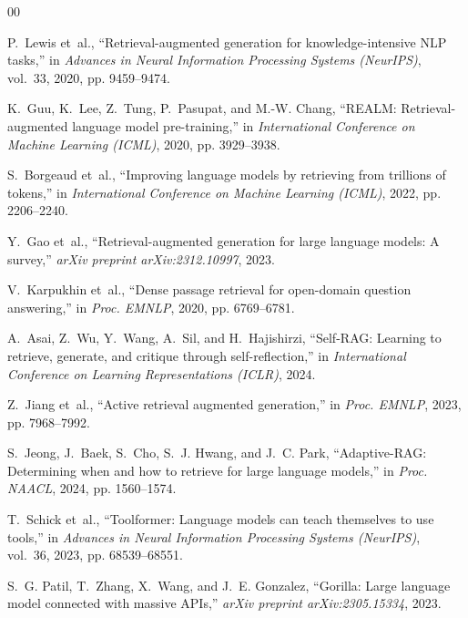 \documentclass[conference,onecolumn,10pt]{IEEEtran}
\begin{document}
\begin{thebibliography}{00}

P.~Lewis et~al., ``Retrieval-augmented generation for knowledge-intensive {NLP} tasks,'' in \textit{Advances in Neural Information Processing Systems (NeurIPS)}, vol.~33, 2020, pp. 9459--9474.

K.~Guu, K.~Lee, Z.~Tung, P.~Pasupat, and M.-W. Chang, ``{REALM}: Retrieval-augmented language model pre-training,'' in \textit{International Conference on Machine Learning (ICML)}, 2020, pp. 3929--3938.

S.~Borgeaud et~al., ``Improving language models by retrieving from trillions of tokens,'' in \textit{International Conference on Machine Learning (ICML)}, 2022, pp. 2206--2240.

Y.~Gao et~al., ``Retrieval-augmented generation for large language models: A survey,'' \textit{arXiv preprint arXiv:2312.10997}, 2023.

V.~Karpukhin et~al., ``Dense passage retrieval for open-domain question answering,'' in \textit{Proc. EMNLP}, 2020, pp. 6769--6781.

A.~Asai, Z.~Wu, Y.~Wang, A.~Sil, and H.~Hajishirzi, ``Self-{RAG}: Learning to retrieve, generate, and critique through self-reflection,'' in \textit{International Conference on Learning Representations (ICLR)}, 2024.

Z.~Jiang et~al., ``Active retrieval augmented generation,'' in \textit{Proc. EMNLP}, 2023, pp. 7968--7992.

S.~Jeong, J.~Baek, S.~Cho, S.~J. Hwang, and J.~C. Park, ``Adaptive-{RAG}: Determining when and how to retrieve for large language models,'' in \textit{Proc. NAACL}, 2024, pp. 1560--1574.

T.~Schick et~al., ``Toolformer: Language models can teach themselves to use tools,'' in \textit{Advances in Neural Information Processing Systems (NeurIPS)}, vol.~36, 2023, pp. 68539--68551.

S.~G. Patil, T.~Zhang, X.~Wang, and J.~E. Gonzalez, ``Gorilla: Large language model connected with massive {APIs},'' \textit{arXiv preprint arXiv:2305.15334}, 2023.


\end{thebibliography}
\end{document}
